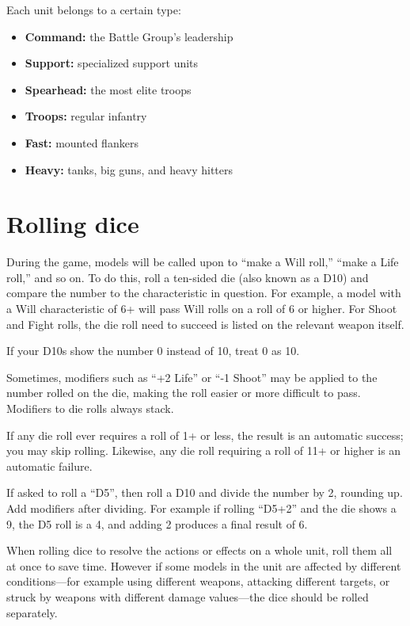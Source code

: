 \begin{multicols}{2}
Each unit belongs to a certain type:

\begin{itemize}
    \item \textbf{Command:} the Battle Group's leadership
    \item \textbf{Support:} specialized support units
    \item \textbf{Spearhead:} the most elite troops
    \item \textbf{Troops:} regular infantry
    \item \textbf{Fast:} mounted flankers
    \item \textbf{Heavy:} tanks, big guns, and heavy hitters
\end{itemize}




\section*{Rolling dice}

During the game, models will be called upon to ``make a Will roll,'' ``make a Life roll,'' and so on. To do this, roll a ten-sided die (also known as a D10) and compare the number to the characteristic in question. For example, a model with a Will characteristic of 6+ will pass Will rolls on a roll of 6 or higher. For Shoot and Fight rolls, the die roll need to succeed is listed on the relevant weapon itself.

If your D10s show the number 0 instead of 10, treat 0 as 10.

Sometimes, modifiers such as ``+2 Life'' or ``-1 Shoot'' may be applied to the number rolled on the die, making the roll easier or more difficult to pass. Modifiers to die rolls always stack.

If any die roll ever requires a roll of 1+ or less, the result is an automatic success; you may skip rolling. Likewise, any die roll requiring a roll of 11+ or higher is an automatic failure.

If asked to roll a ``D5'', then roll a D10 and divide the number by 2, rounding up. Add modifiers after dividing. For example if rolling ``D5+2'' and the die shows a 9, the D5 roll is a 4, and adding 2 produces a final result of 6.

When rolling dice to resolve the actions or effects on a whole unit, roll them all at once to save time. However if some models in the unit are affected by different conditions—for example using different weapons, attacking different targets, or struck by weapons with different damage values—the dice should be rolled separately.





\end{multicols}
